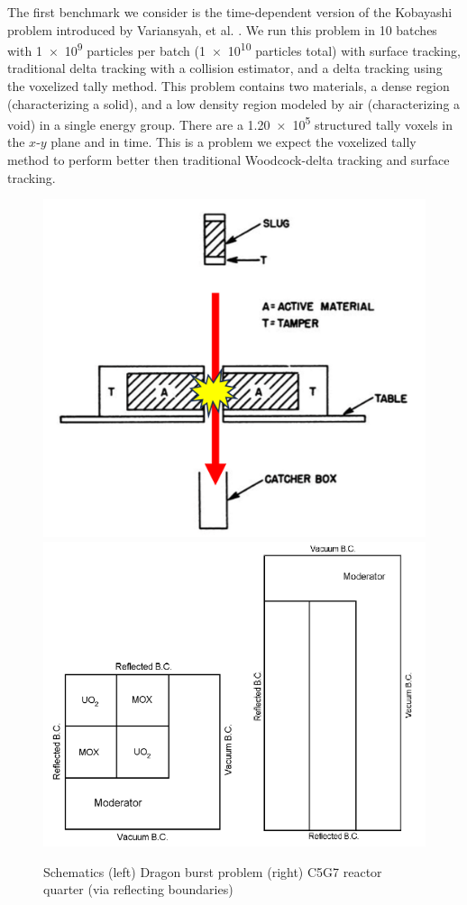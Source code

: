 The first benchmark we consider is the time-dependent version of the Kobayashi problem \cite{Kobayashi2001} introduced by Variansyah, et al. \cite{variansyah_mc23_mcdc}.
We run this problem in 10 batches with \num{1e9} particles per batch (\num{1e10} particles total) with surface tracking, traditional delta tracking with a collision estimator, and a delta tracking using the voxelized tally method.
This problem contains two materials, a dense region (characterizing a solid), and a low density region modeled by air (characterizing a void) in a single energy group.
There are a \num{1.20e5} structured tally voxels in the $x$-$y$ plane and in time.
This is a problem we expect the voxelized tally method to perform better then traditional Woodcock-delta tracking and surface tracking.

\begin{figure}
    \centering
    \includegraphics[width=0.48\linewidth]{figures/delta_figs/dragon.png}
    \includegraphics[width=0.48\linewidth]{figures/delta_figs/c5g7.png}
    \caption{Schematics (left) Dragon burst problem \cite{kimpland2021dragon} (right) C5G7 reactor quarter (via reflecting boundaries) \cite{jia_hou_oecdnea_2017}}
    \label{fig:schems}
\end{figure}

